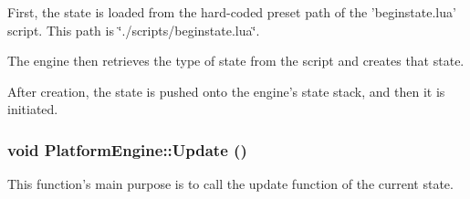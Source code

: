 First, the state is loaded from the hard-coded preset path of the 'beginstate.lua' script. This path is \char`\"{}./scripts/beginstate.lua\char`\"{}.

The engine then retrieves the type of state from the script and creates that state.

After creation, the state is pushed onto the engine's state stack, and then it is initiated.\hypertarget{class_platform_engine_d3ab75304226ad3fcac6b66ce3cedbc7}{
\subsubsection[{Update}]{\setlength{\rightskip}{0pt plus 5cm}void PlatformEngine::Update ()}}
\label{db/da1/class_platform_engine_d3ab75304226ad3fcac6b66ce3cedbc7}


This function's main purpose is to call the update function of the current state. 